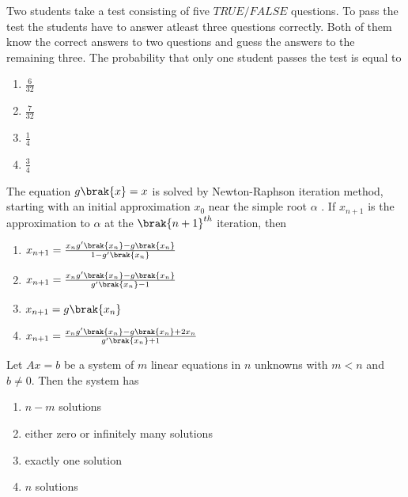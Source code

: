     \item Two students take a test consisting of five $TRUE / FALSE$ questions. To pass the test the students have to answer atleast three questions correctly. Both of them know the correct answers to two questions and guess the answers to the remaining three. The probability that only one student passes the test is equal to
        \begin{enumerate}
            \item $\frac{6}{32}$
            \item $\frac{7}{32}$
            \item $\frac{1}{4}$
            \item $\frac{3}{4}$
        \end{enumerate}

    \item The equation $g\brak{x} = x$ is solved by Newton-Raphson iteration method, starting with an initial approximation $x_0$ near the simple root $\alpha$ . If $x_{n+1}$ is the approximation to $\alpha$ at the $\brak{n+1}^{th}$ iteration, then
        \begin{enumerate}
            \item $x_{n+1} = \frac{x_n g^{\prime}\brak{x_n}-g\brak{x_n}}{1 - g^{\prime}\brak{x_n}}$
            \item $x_{n+1} = \frac{x_n g^{\prime}\brak{x_n}-g\brak{x_n}}{g^{\prime}\brak{x_n}-1}$
            \item $x_{n+1} = g\brak{x_n}$
            \item $x_{n+1} = \frac{x_n g^{\prime}\brak{x_n}-g\brak{x_n}+ 2 x_n}{g^{\prime}\brak{x_n}+1}$
        \end{enumerate}

    \item Let $Ax= b$ be a system of $m$ linear equations in $n$ unknowns with $m< n$ and $b\neq0$. Then the system has
        \begin{enumerate}
            \item $n-m$ solutions
            \item either zero or infinitely many solutions
            \item exactly one solution
            \item $n$ solutions
        \end{enumerate}

